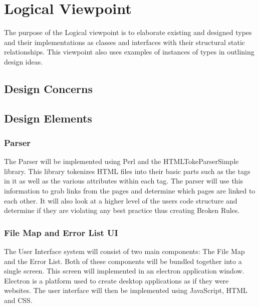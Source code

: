 \documentclass[letterpaper,10pt,titlepage,draftclsnofoot,onecolumn,onesided] {IEEEtran}
\begin{document}
	
	
\section{Logical Viewpoint}
The purpose of the Logical viewpoint is to elaborate existing and designed types and their implementations
as classes and interfaces with their structural static relationships. This viewpoint also uses examples of
instances of types in outlining design ideas. 
\subsection{Design Concerns}
\subsection{Design Elements}


	\subsubsection{Parser}
	The Parser will be implemented using Perl and the HTMLTokeParserSimple library.
	This library tokenizes HTML files into their basic parts such as the tags in it as well as the various attributes within each tag.
	The parser will use this information to grab links from the pages and determine which pages are linked to each other.
	It will also look at a higher level of the users code structure and determine if they are violating any best practice thus creating Broken Rules. 

	\subsubsection{File Map and Error List UI}
	The User Interface system will consist of two main components: The File Map and the Error List. 
	Both of these components will be bundled together into a single screen. 
	This screen will implemented in an electron application window. 
	Electron is a platform used to create desktop applications as if they were websites.
	The user interface will then be implemented using JavaScript, HTML and CSS.
	
\end{document}
